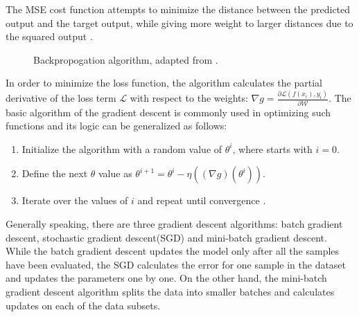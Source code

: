 The MSE cost function attempts to minimize the distance between the predicted output and the target output, while giving more weight to larger distances due to the squared output \cite{Albarghouthi2021}.


\begin{figure}[htb]
    \centering
    \qquad
    \caption{Backpropogation algorithm, adapted from \cite{Alber2018}.}\label{fig:backprop}%
\end{figure}
\FloatBarrier

In order to minimize the loss function, the algorithm calculates the partial derivative of the loss term $\mathcal{L}$ with respect to the weights: $\nabla g = \frac{\partial \mathcal{L}(f(x_i), y_i)}{\partial \mathcal{W}}$. The basic algorithm of the gradient descent is commonly used in optimizing such functions and its logic can be generalized as follows: 

\begin{enumerate}
  \item Initialize the algorithm with a random value of $\theta^{i}$, where starts with $i=0$.
  \item Define the next $\theta$ value as $\theta^{i+1} = \theta^{i}-\eta\left((\nabla g)\left(\theta^{i}\right)\right)$.
  \item Iterate over the values of $i$ and repeat until convergence \cite{Albarghouthi2021}.
\end{enumerate} 

Generally speaking, there are three gradient descent algorithms: batch gradient descent, stochastic gradient descent(SGD) and mini-batch gradient descent. While the batch gradient descent updates the model only after all the samples have been evaluated, the SGD calculates the error for one sample in the dataset and updates the parameters one by one. On the other hand, the mini-batch gradient descent algorithm splits the data into smaller batches and calculates updates on each of the data subsets. 

